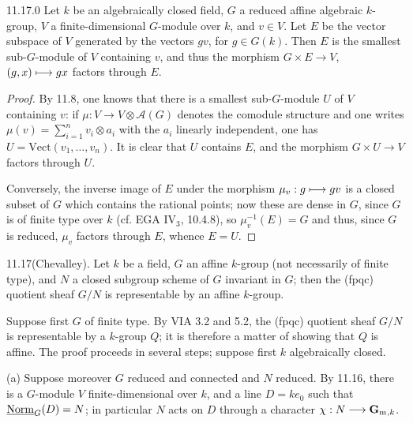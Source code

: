 \begin{lemma}{11.17.0}\label{VIB.11.17.0}
Let $k$ be an algebraically closed field, $G$ a reduced affine algebraic $k$-group, $V$ a finite-dimensional $G$-module over $k$, and $v\in V$. Let $E$ be the vector subspace of $V$ generated by the vectors $gv$, for $g\in G(k)$. Then $E$ is the smallest sub-$G$-module of $V$ containing $v$, and thus the morphism $G\times E\to V$, $(g,x)\longmapsto gx$ factors through $E$.
\end{lemma}
\begin{proof}
By 11.8, one knows that there is a smallest sub-$G$-module $U$ of $V$ containing $v$: if $\mu:V\to V\otimes\mathscr A(G)$ denotes the comodule structure and one writes $\mu(v)=\sum_{i=1}^n v_i\otimes a_i$ with the $a_i$ linearly independent, one has $U=\mathrm{Vect}(v_1,\ldots,v_n)$. It is clear that $U$ contains $E$, and the morphism $G\times U\to V$ factors through $U$.

Conversely, the inverse image of $E$ under the morphism $\mu_v:g\longmapsto gv$ is a closed subset of $G$ which contains the rational points; now these are dense in $G$, since $G$ is of finite type over $k$ (cf. EGA IV$_3$, 10.4.8), so $\mu_v^{-1}(E)=G$ and thus, since $G$ is reduced, $\mu_v$ factors through $E$, whence $E=U$.
\end{proof}

\begin{theorem}{11.17}\label{VIB.11.17}\textup{(Chevalley).}
Let $k$ be a field, $G$ an affine $k$-group (not necessarily of finite type), and $N$ a closed subgroup scheme of $G$ invariant in $G$; then the (fpqc) quotient sheaf $G/N$ is representable by an affine $k$-group.
\end{theorem}
Suppose first $G$ of finite type. By VIA 3.2 and 5.2, the (fpqc) quotient sheaf $G/N$ is representable by a $k$-group $Q$; it is therefore a matter of showing that $Q$ is affine. The proof proceeds in several steps; suppose first $k$ algebraically closed.

(a) Suppose moreover $G$ reduced and connected and $N$ reduced. By 11.16, there is a $G$-module $V$ finite-dimensional over $k$, and a line $D=ke_0$ such that $\underline{\mathrm{Norm}}_G(D)=N$; in particular $N$ acts on $D$ through a character $\chi:N\longrightarrow\mathbf{G}_{\mathrm{m}}{}_{,k}$.

